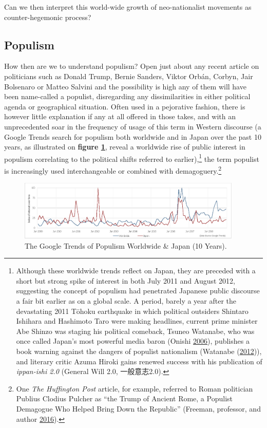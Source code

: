 \documentclass[10pt,british,A4paper,,openany]{memoir}
\begin{document}
Can we then interpret this world-wide growth of neo-nationalist
movements as counter-hegemonic process?

\subsection{Populism}\label{populism}

How then are we to understand populism? Open just about any recent
article on politicians such as Donald Trump, Bernie Sanders, Viktor
Orbán, Corbyn, Jair Bolsenaro or Matteo Salvini and the possibility is
high any of them will have been name-called a populist, disregarding any
dissimilarities in either political agenda or geographical situation.
Often used in a pejorative fashion, there is however little explanation
if any at all offered in those takes, and with an unprecedented soar in
the frequency of usage of this term in Western discourse (a Google
Trends search for populism both worldwide and in Japan over the past 10
years, as illustrated on \textbf{figure \ref{fig:populism-gt}}, reveal a
worldwide rise of public interest in populism correlating to the
political shifts referred to earlier),\footnote{Although these worldwide
  trends reflect on Japan, they are preceded with a short but strong
  spike of interest in both July 2011 and August 2012, suggesting the
  concept of populism had penetrated Japanese public discourse a fair
  bit earlier as on a global scale. A period, barely a year after the
  devastating 2011 Tōhoku earthquake in which political outsiders
  Shintaro Ishihara and Hashimoto Taro were making headlines, current
  prime minister Abe Shinzo was staging his political comeback, Tsuneo
  Watanabe, who was once called Japan's most powerful media baron
  (Onishi \protect\hyperlink{ref-onishi_shadow_2006}{2006}), publishes a
  book warning against the dangers of populist nationalism (Watanabe
  (\protect\hyperlink{ref-watanabe_anti-populism_2012}{2012})), and
  literary critic Azuma Hiroki gains renewed success with his
  publication of \emph{ippan-ishi 2.0} (General Will 2.0, 一般意志2.0).}
the term populist is increasingly used interchangeable or combined with
demagoguery.\footnote{One \emph{The Huffington Post} article, for
  example, referred to Roman politician Publius Clodius Pulcher as ``the
  Trump of Ancient Rome, a Populist Demagogue Who Helped Bring Down the
  Republic'' (Freeman, professor, and author
  \protect\hyperlink{ref-freeman_meet_2016}{2016}).}

\begin{figure}[!htb]
 \centering
 \caption{\label{fig:populism-gt} The Google Trends of Populism Worldwide \& Japan (10 Years).}
 \includegraphics[width=0.95\textwidth,trim=4 4 4 4,clip]{images/populismtrends.eps}\end{figure}
\end{document}
